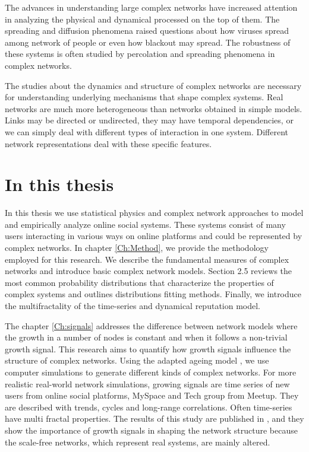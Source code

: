 
The advances in understanding large complex networks have increased attention in analyzing the physical and dynamical processed on the top of them.  The spreading and diffusion phenomena raised questions about how viruses spread among network of people or even how blackout may spread. The robustness of these systems is often studied by percolation and spreading phenomena in complex networks. %

The studies about the dynamics and structure of complex networks are necessary for understanding underlying mechanisms that shape complex systems. Real networks are much more heterogeneous than networks obtained in simple models. Links may be directed or undirected, they may have temporal dependencies, or we can simply deal with different types of interaction in one system. Different network representations deal with these specific features. %




\section{In this thesis}

In this thesis we use statistical physics and complex network approaches to model and empirically analyze online social systems. These systems consist of many users interacting in various ways on online platforms and could be represented by complex networks. In chapter \ref{Ch:Method}, we provide the methodology employed for this research. We describe the fundamental measures of complex networks and introduce basic complex network models. Section 2.5 reviews the most common probability distributions that characterize the properties of complex systems and outlines distributions fitting methods. Finally, we introduce the multifractality of the time-series and dynamical reputation model. 

The chapter \ref{Ch:signals} addresses the difference between network models where the growth in a number of nodes is constant and when it follows a non-trivial growth signal. This research aims to quantify how growth signals influence the structure of complex networks. Using the adapted ageing model \cite{hajra2004}, we use computer simulations to generate different kinds of complex networks. For more realistic real-world network simulations, growing signals are time series of new users from online social platforms, MySpace and Tech group from Meetup. They are described with trends, cycles and long-range correlations. Often time-series have multi fractal properties. The results of this study are published in \cite{vranic2021growth}, and they show the importance of growth signals in shaping the network structure because the scale-free networks, which represent real systems, are mainly altered. 

